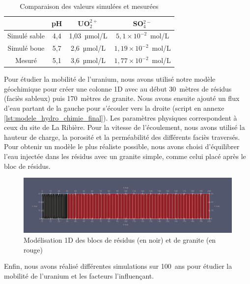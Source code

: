 \documentclass{article}
\begin{document}
	
\begin{table}[H]
    \centering    
    \caption{Comparaison des valeurs simulées et mesurées}
    \begin{tabular}{ |c |c |c |c |}
        \hline
         \textbf{} & \textbf{pH} & \textbf{UO$_2^{2+}$} & \textbf{SO$_4^{2-}$}\\ 
         \hline
         Simulé sable & 4,4 & 1,03~µmol/L & $5,1 \times 10^{-2}$~mol/L \\ 
         \hline
         Simulé boue & 5,7 & 2,6~µmol/L & $1,19 \times 10^{-2}$~mol/L  \\
         \hline
        Mesuré & 5,1 & 3,6~µmol/L & $1,77 \times 10^{-2}$~mol/L  \\
         \hline
    \end{tabular}

    \label{tab:comparaison_valeurs_simul_mesure}
\end{table}


Pour étudier la mobilité de l’uranium, nous avons utilisé notre modèle géochimique pour créer une colonne 1D avec au début 30~mètres de résidus (faciès sableux) puis 170~mètres de granite. Nous avons ensuite ajouté un flux d’eau partant de la gauche pour s’écouler vers la droite (script en annexe \ref{lst:modele_hydro_chimie_final}). Les paramètres physiques correspondent à ceux du site de La Ribière. Pour la vitesse de l’écoulement, nous avons utilisé la hauteur de charge, la porosité et la perméabilité des différents faciès traversés. Pour obtenir un modèle le plus réaliste possible, nous avons choisi d’équilibrer l’eau injectée dans les résidus avec un granite simple, comme celui placé après le bloc de résidus.

\begin{figure}[H]
    \centering
    \includegraphics[width=0.9\linewidth]{III_B_2_1.png}
    \caption{Modélisation 1D des blocs de résidus (en noir) et de granite (en rouge)}
    \label{fig:modele_bloc}
\end{figure}

Enfin, nous avons réalisé différentes simulations sur 100~ans pour étudier la mobilité de l’uranium et les facteurs l’influençant.
\end{document}
